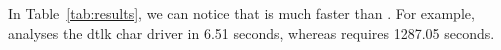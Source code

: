 In Table~\ref{tab:results}, we can notice that \whoop is much faster than \corral. For example, \whoop analyses the dtlk char driver in 6.51 seconds, whereas \corral requires 1287.05 seconds.


